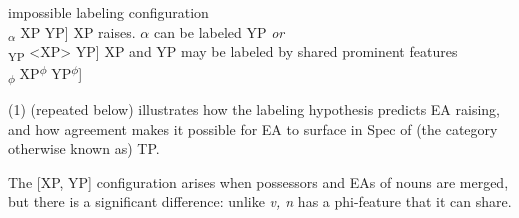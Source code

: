 \documentclass[output=paper
,modfonts
,nonflat]{langsci/langscibook}
\begin{document}
{\begin{exe}
	\ex 
	\xlist
	\ex impossible labeling configuration\\
	{\lbrack}\textsubscript{$\alpha$} XP YP] 
	\ex XP raises. ${\alpha}$ can be labeled YP  \textit{or}\\
	{\lbrack}\textsubscript{YP} <XP> YP] 
	\ex XP and YP may be labeled by shared prominent features\\
	{\lbrack}\textsubscript{$\phi$} XP\textsuperscript{$\phi$} YP\textsuperscript{$\phi$}] 
	\endxlist
\end{exe}
(1) (repeated below) illustrates how the labeling hypothesis predicts EA raising, and how agreement makes it possible for EA to surface in Spec of (the category otherwise known as) TP.
\begin{comment}
\begin{exe}
\ex
\xlist
	\ex $\alpha$ cannot be labeled\newline
	{\lbrack}$\alpha$ [\textsubscript{DP} the girl] [\textsubscript{vP} \textit{v} [\textsubscript{VP} feed [\textsubscript{DP} the dog]{\rbrack} 
	\ex after EA raising, $\alpha$ labeled vP based on its head v\newline
	{\lbrack}\textsubscript{vP} {\textless}the girl{\textgreater} [\textsubscript{vP} \textit{v} [\textsubscript{VP} feed [\textsubscript{DP} the dog]{\rbrack} 
	\ex ...but first, Agree (T, SU)\newline
	{\lbrack}T\textsubscript{u$\phi$} [\textsubscript{vP} [\textsubscript{DP} the girl\textsubscript{$\phi$}] [\textsubscript{vP} \textit{v} [\textsubscript{VP} feed [\textsubscript{DP} the dog]{\rbrack} 
		\ex shared prominent features label $\phi$P\newline
	{\lbrack}\textsubscript{$\phi$P} [\textsubscript{DP} the girl]\textsuperscript{$\phi$} will\textsuperscript{$\phi$} [\textsubscript{vP} <the girl> \textit{v} [feed the dog]]{\rbrack}  
\endxlist
\end{exe}
\end{comment}
The [XP, YP] configuration arises when possessors and EAs of nouns are merged, but there is a significant difference: unlike \textit{v, n} has a phi-feature that it can share. 

}
\end{document}
